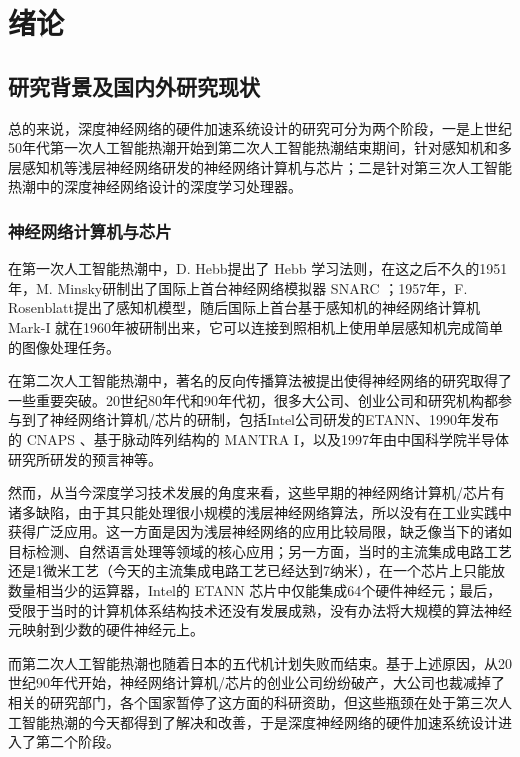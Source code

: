 \chapter{绪论}\label{chap:preface}

\section{研究背景及国内外研究现状}

总的来说，深度神经网络的硬件加速系统设计的研究可分为两个阶段，一是上世纪50年代第一次人工智能热潮开始到第二次人工智能热潮结束期间，针对感知机和多层感知机等浅层神经网络研发的神经网络计算机与芯片；二是针对第三次人工智能热潮中的深度神经网络设计的深度学习处理器。

\subsection{神经网络计算机与芯片}

在第一次人工智能热潮中，D. Hebb提出了 Hebb 学习法则，在这之后不久的1951年，M. Minsky研制出了国际上首台神经网络模拟器 SNARC ；1957年，F. Rosenblatt提出了感知机模型，随后国际上首台基于感知机的神经网络计算机 Mark-I 就在1960年被研制出来，它可以连接到照相机上使用单层感知机完成简单的图像处理任务。

在第二次人工智能热潮中，著名的反向传播算法被提出使得神经网络的研究取得了一些重要突破。20世纪80年代和90年代初，很多大公司、创业公司和研究机构都参与到了神经网络计算机/芯片的研制，包括Intel公司研发的ETANN\cite{118698}、1990年发布的 CNAPS\cite{5726581} 、基于脉动阵列结构的 MANTRA I\cite{714364}，以及1997年由中国科学院半导体研究所研发的预言神\cite{人工神经网络硬件化途径与神经计算机研究}等。

然而，从当今深度学习技术发展的角度来看，这些早期的神经网络计算机/芯片有诸多缺陷，由于其只能处理很小规模的浅层神经网络算法，所以没有在工业实践中获得广泛应用。这一方面是因为浅层神经网络的应用比较局限，缺乏像当下的诸如目标检测、自然语言处理等领域的核心应用；另一方面，当时的主流集成电路工艺还是1微米工艺（今天的主流集成电路工艺已经达到7纳米），在一个芯片上只能放数量相当少的运算器，Intel的 ETANN 芯片中仅能集成64个硬件神经元；最后，受限于当时的计算机体系结构技术还没有发展成熟，没有办法将大规模的算法神经元映射到少数的硬件神经元上。

而第二次人工智能热潮也随着日本的五代机计划失败而结束。基于上述原因，从20世纪90年代开始，神经网络计算机/芯片的创业公司纷纷破产，大公司也裁减掉了相关的研究部门，各个国家暂停了这方面的科研资助，但这些瓶颈在处于第三次人工智能热潮的今天都得到了解决和改善，于是深度神经网络的硬件加速系统设计进入了第二个阶段。

